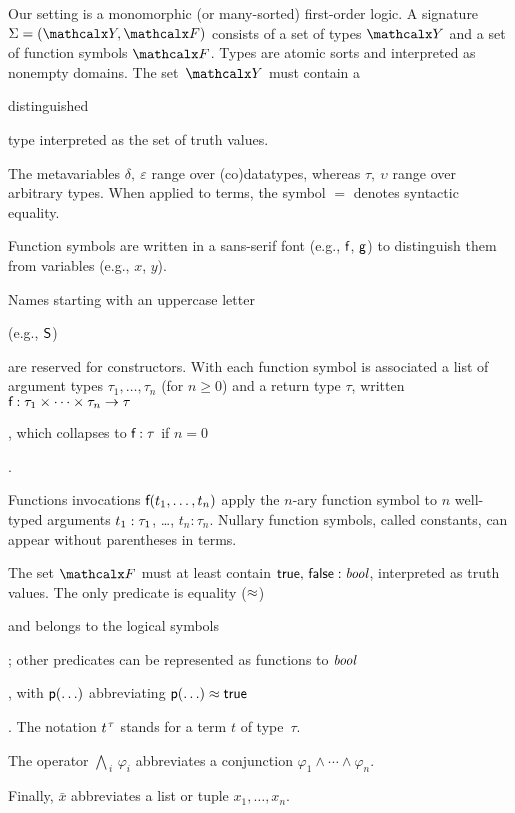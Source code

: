 \begin{conf}
\kern-2.9pt %
\end{conf}

Our setting is a monomorphic (or many-sorted) first-order logic.
A signature $\Sig = (\Types, \Funcs)$ consists of a set of types $\Types$ and a
set of function symbols $\Funcs$. Types are atomic sorts and interpreted as
nonempty domains. The set~$\Types$ must contain a
\begin{rep}distinguished \end{rep}type  interpreted as the set of truth
values. %
\begin{rep}
The metavariables $\delta,\:\varepsilon$ range over (co)datatypes,
whereas $\tau,\:\upsilon$ range over arbitrary types.
When applied to terms, the symbol $=$ denotes syntactic equality.

Function symbols are written in a sans-serif font (e.g., $\textsf{f}$, $\textsf{g}$) to
distinguish them from variables (e.g., $x$, $y$).
\end{rep}
Names starting with an uppercase letter \begin{rep}(e.g.,
$\textsf{S}$) \end{rep}are reserved for constructors. With each function symbol 
is associated a list of argument types $\tau_1,\ldots,\tau_n$ (for $n \ge 0$)
and a return type $\tau$, written
$\textsf{f} : \tau_1 \times \cdots \times \tau_n \to \tau$\begin{rep},
which collapses to $\textsf{f} : \tau$ if $n = 0$\end{rep}.
\begin{rep}%
Functions invocations $\textsf{f}(t_1,\ldots,t_n)$
apply the $n$-ary function symbol
 to $n$ well-typed arguments $t_1 :\nobreak \tau_1$, \ldots, $t_n :
\tau_n$. Nullary function symbols, called constants, can appear without
parentheses in terms.
\end{rep}
The set $\Funcs$ must at least contain
$\textsf{true},\, \textsf{false} : \textit{bool}$, interpreted as truth values.
The only predicate is equality ($\approx$)\begin{rep} and belongs to the logical symbols\end{rep};
other predicates can be represented as functions to $\textit{bool}$\begin{rep},
with $\textsf{p}(\ldots)$ abbreviating $\textsf{p}(\ldots) \approx \textsf{true}$\end{rep}.
The notation $t\typ{\tau}$ stands for a term $t$ of type~$\tau$.
\begin{rep}The operator $\bigwedge_{\,i}\, \varphi_i$ abbreviates a conjunction
$\varphi_1 \mathrel\land \cdots \mathrel\land \varphi_n$. \end{rep}%
Finally, $\bar x$ abbreviates a list or tuple $x_1,\ldots,x_n$.

